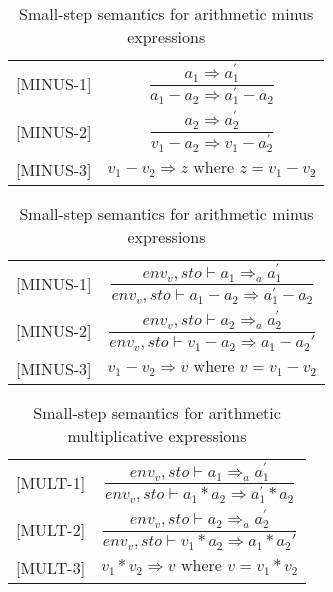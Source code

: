 \begin{table}[H]
    \centering
    \begin{longtable}[c] { r c }
        
        [MINUS-1] & \( \dfrac{a_1 \Rightarrow a^{'}_{1}}{a_1 - a_2 \Rightarrow a^{'}_{1} - a_2} \) \\
        
        [MINUS-2] & \( \dfrac{a_2 \Rightarrow a^{'}_{2}}{v_1 - a_2 \Rightarrow v_1 - a^{'}_{2}} \) \\
        
        [MINUS-3] & \(v_1 - v_2 \Rightarrow z \text{ where } z = v_1 - v_2\) \\
        
        
    \end{longtable}
    \caption{Small-step semantics for arithmetic minus expressions}
\end{table}
\fi

\begin{table}[H]
    \centering
    \begin{longtable}[c] { r c }
        [MINUS-1] & \( \dfrac{ env_v,sto \vdash a_1 \Rightarrow_a a^{'}_{1}}{env_v,sto \vdash a_1 - a_2 \Rightarrow a^{'}_{1} - a_2} \) \\
        
        [MINUS-2] & \( \dfrac{ env_v,sto \vdash a_2 \Rightarrow_a a^{'}_{2}}{env_v,sto \vdash v_1 - a_2 \Rightarrow a_{1} - a_2{'}} \) \\
        
        [MINUS-3] & \(v_1 - v_2 \Rightarrow v \text{ where } v = v_1 - v_2\) \\
    \end{longtable}
    \caption{Small-step semantics for arithmetic minus expressions}
\end{table}

\begin{table}[H]
    \centering
    \begin{longtable}[c] { r c }
        [MULT-1] & \( \dfrac{ env_v,sto \vdash a_1 \Rightarrow_a a^{'}_{1}}{env_v,sto \vdash a_1 * a_2 \Rightarrow a^{'}_{1} * a_2} \) \\
        
        [MULT-2] & \( \dfrac{ env_v,sto \vdash a_2 \Rightarrow_a a^{'}_{2}}{env_v,sto \vdash v_1 * a_2 \Rightarrow a_{1} * a_2{'}} \) \\
        
        [MULT-3] & \(v_1 * v_2 \Rightarrow v \text{ where } v = v_1 * v_2\) \\
    \end{longtable}
    \caption{Small-step semantics for arithmetic multiplicative expressions}
\end{table}



